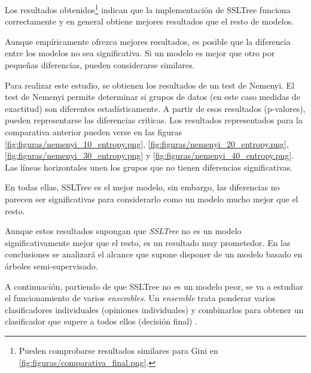 Los resultados obtenidos\footnote{Pueden comprobarse resultados similares para Gini en \ref{fig:figuras/comparativa_final.png}.} indican que la implementación de SSLTree funciona correctamente y en general obtiene mejores resultados que el resto de modelos.

Aunque empíricamente ofrezca mejores resultados, es posible que la diferencia entre los modelos no sea significativa. Si un modelo es mejor que otro por pequeñas diferencias, pueden considerarse similares.

Para realizar este estudio, se obtienen los resultados de un test de Nemenyi. El test de Nemenyi permite determinar si grupos de datos (en este caso medidas de exactitud) son diferentes estadísticamente. A partir de esos resultados (p-valores), pueden representarse las diferencias críticas. Los resultados representados para la comparativa anterior pueden verse en las figuras \ref{fig:figuras/nemenyi_10_entropy.png}, \ref{fig:figuras/nemenyi_20_entropy.png}, \ref{fig:figuras/nemenyi_30_entropy.png} y \ref{fig:figuras/nemenyi_40_entropy.png}. Las líneas horizontales unen los grupos que no tienen diferencias significativas.

En todas ellas, SSLTree es el mejor modelo, sin embargo, las diferencias no parecen ser significativas para considerarlo como un modelo mucho mejor que el resto.





Aunque estos resultados supongan que \textit{SSLTree} no es un modelo significativamente mejor que el resto, es un resultado muy prometedor. En las conclusiones se analizará el alcance que supone disponer de un modelo basado en árboles semi-supervisado.

A continuación, partiendo de que SSLTree no es un modelo peor, se va a estudiar el funcionamiento de varios \textit{ensembles}. Un \textit{ensemble} trata ponderar varios clasificadores individuales (opiniones individuales) y combinarlos para obtener un clasificador que supere a todos ellos (decisión final) \cite{rokach2010ensemble}.

